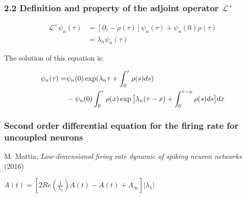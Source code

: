 \documentclass{beamer}
\begin{document}
\begin{frame}
\frametitle{2.2 Definition and property of the adjoint operator $\mathcal{L}^+$}
\begin{align*}
\mathcal{L}^+\psi_n(\tau)&=[\partial_{\tau}-\rho(\tau)]\psi_n(\tau)+\psi_n(0)\rho(\tau)\\
&=\lambda_n\psi_n(\tau)
\end{align*}

The solution of this equation is:

\vspace{0.2cm}

\begin{align*}
\psi_n(\tau)=&\psi_n(0)\exp(\lambda_n\tau+\int_0^\tau\rho(s)ds)\\
&-\psi_n(0)\int^\tau_0\rho(x)\exp\big{[}\lambda_n(\tau-x)+\int_0^{\tau-x}\rho(s)ds\big{]}dx
\end{align*}
\end{frame}

\begin{frame}
\frametitle{ Second order differential equation for the firing rate for uncoupled neurons}

\vspace{1cm}
M. Mattia, \textit{Low-dimensional firing rate dynamic of spiking neuron networks} (2016)

\vspace{1cm}

\hspace{1cm}$\ddot A(t)=[2Re(\frac{1}{\lambda_1})\dot A(t)-A(t)+A_{\infty}] |{\lambda_1}|$

\end{frame}
\end{document}

